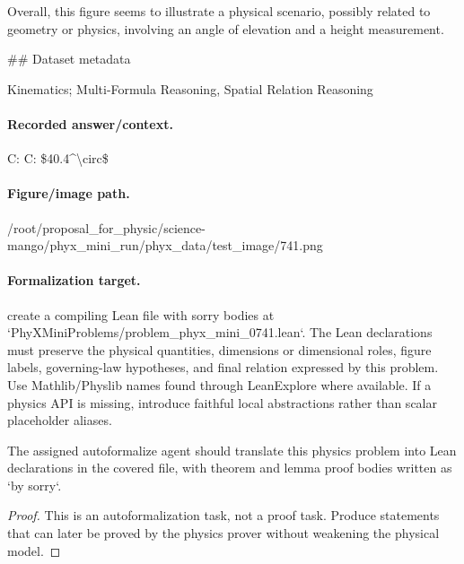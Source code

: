 Overall, this figure seems to illustrate a physical scenario, possibly related to geometry or physics, involving an angle of elevation and a height measurement.

\#\# Dataset metadata

Kinematics; Multi-Formula Reasoning, Spatial Relation Reasoning

\paragraph{Recorded answer/context.}
C: C: \$40.4\textasciicircum{}\textbackslash{}circ\$

\paragraph{Figure/image path.}
/root/proposal\_for\_physic/science-mango/phyx\_mini\_run/phyx\_data/test\_image/741.png

\paragraph{Formalization target.}
create a compiling Lean file with sorry bodies at `PhyXMiniProblems/problem\_phyx\_mini\_0741.lean`. The Lean declarations must preserve the physical quantities, dimensions or dimensional roles, figure labels, governing-law hypotheses, and final relation expressed by this problem.
Use Mathlib/Physlib names found through LeanExplore where available. If a physics API is missing, introduce faithful local abstractions rather than scalar placeholder aliases.

\begin{theorem}
\label{thm:physics:phyx_mini_0741:target}
The assigned autoformalize agent should translate this physics problem into Lean declarations in the covered file, with theorem and lemma proof bodies written as `by sorry`.
\end{theorem}
\begin{proof}
This is an autoformalization task, not a proof task. Produce statements that can later be proved by the physics prover without weakening the physical model.
\end{proof}

